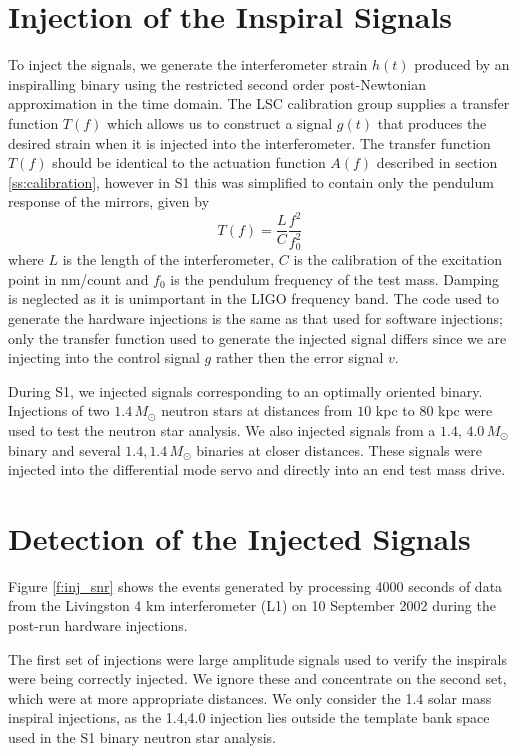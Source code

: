 \section{Injection of the Inspiral Signals}
\label{s:injecting}

To inject the signals, we generate the interferometer strain $h(t)$ produced
by an inspiralling binary using the restricted second order post-Newtonian
approximation in the time domain\cite{Blanchet:1996pi}.  The LSC calibration group
supplies a transfer function $T(f)$ which allows us to construct a signal
$g(t)$ that produces the desired strain when it is injected into the
interferometer.  The transfer function $T(f)$ should be identical to the
actuation function $A(f)$ described in section \ref{ss:calibration}, however
in S1 this was simplified to contain only the pendulum response of the mirrors,
given by 
\begin{equation}
T(f) = \frac{L}{C}\frac{f^2}{f_0^2}
\end{equation}
where $L$ is the length of the interferometer, $C$ is the calibration of the
excitation point in nm/count and $f_0$ is the pendulum frequency of the test
mass. Damping is neglected as it is unimportant in the LIGO frequency band.
The code used to generate the hardware injections is the same as that used
for software injections; only the transfer function used to generate the
injected signal differs since we are injecting into the control signal $g$
rather then the error signal $v$.

During S1, we injected signals corresponding to an optimally oriented binary.
Injections of two $1.4\,M_\odot$ neutron stars at distances from $10$ kpc to
$80$ kpc were used to test the neutron star analysis. 
We also injected signals from a $1.4,\,4.0\,M_\odot$ binary and several
$1.4,1.4\,M_\odot$ binaries at closer distances.  These signals were injected
into the differential mode servo and directly into an end test mass drive.

\section{Detection of the Injected Signals}
\label{s:detection}

Figure \ref{f:inj_snr} shows the events generated by processing 4000 seconds
of data from the Livingston 4 km interferometer (L1) on 10 September 2002
during the post-run hardware injections.

The first set of injections were large amplitude signals used to verify the
inspirals were being correctly injected. We ignore these and concentrate on
the second set, which were at more appropriate distances.  We only consider
the 1.4 solar mass inspiral injections, as the 1.4,4.0 injection lies
outside the template bank space used in the S1 binary neutron star analysis.

